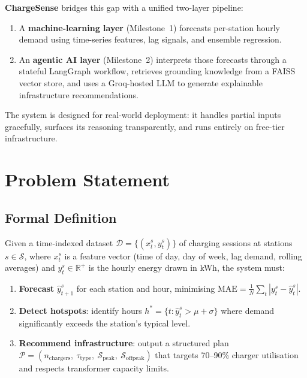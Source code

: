 \documentclass[12pt,a4paper]{article}
\begin{document}
\textbf{ChargeSense} bridges this gap with a unified two-layer pipeline:
\begin{enumerate}[leftmargin=*]
  \item A \textbf{machine-learning layer} (Milestone~1) forecasts per-station hourly
    demand using time-series features, lag signals, and ensemble regression.
  \item An \textbf{agentic AI layer} (Milestone~2) interprets those forecasts through
    a stateful LangGraph workflow, retrieves grounding knowledge from a FAISS vector
    store, and uses a Groq-hosted LLM to generate explainable infrastructure
    recommendations.
\end{enumerate}

The system is designed for real-world deployment: it handles partial inputs gracefully,
surfaces its reasoning transparently, and runs entirely on free-tier infrastructure.

\section{Problem Statement}
\label{sec:problem}

\subsection{Formal Definition}

Given a time-indexed dataset $\mathcal{D} = \{(x_t^s, y_t^s)\}$ of charging sessions
at stations $s \in \mathcal{S}$, where $x_t^s$ is a feature vector (time of day,
day of week, lag demand, rolling averages) and $y_t^s \in \mathbb{R}^+$ is the hourly
energy drawn in kWh, the system must:

\begin{enumerate}[leftmargin=*]
  \item \textbf{Forecast} $\hat{y}^s_{t+1}$ for each station and hour, minimising
    $\text{MAE} = \frac{1}{N}\sum_t |y_t^s - \hat{y}^s_t|$.
  \item \textbf{Detect hotspots}: identify hours $h^* = \{t : \hat{y}^s_t >
    \mu + \sigma\}$ where demand significantly exceeds the station's typical level.
  \item \textbf{Recommend infrastructure}: output a structured plan
    $\mathcal{P} = (n_{\text{chargers}},\ \tau_{\text{type}},\ \mathcal{S}_{\text{peak}},\
    \mathcal{S}_{\text{offpeak}})$ that targets 70–90\% charger utilisation and
    respects transformer capacity limits.
\end{enumerate}
\end{document}
